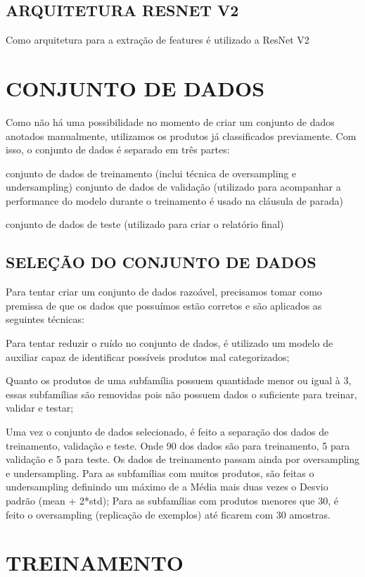 \subsection{ARQUITETURA RESNET V2}

Como arquitetura para a extração de features é utilizado a ResNet V2 

\section{CONJUNTO DE DADOS}
Como não há uma possibilidade no momento de criar um conjunto de dados anotados manualmente, utilizamos os produtos já classificados previamente.     Com isso, o conjunto de dados é separado em três partes:

conjunto de dados de treinamento (inclui técnica de oversampling e undersampling)
conjunto de dados de validação (utilizado para acompanhar a performance do modelo durante o treinamento é usado na cláusula de parada)

conjunto de dados de teste (utilizado para criar o relatório final)

\subsection{SELEÇÃO DO CONJUNTO DE DADOS}

Para tentar criar um conjunto de dados razoável, precisamos tomar como premissa de que os dados que possuímos estão corretos e são aplicados as seguintes técnicas:

Para tentar reduzir o ruído no conjunto de dados, é utilizado um modelo de auxiliar capaz de identificar possíveis produtos mal categorizados;

Quanto os produtos de uma subfamília possuem quantidade menor ou igual à 3, essas subfamílias são removidas pois não possuem dados o suficiente para treinar, validar e testar;

Uma vez o conjunto de dados selecionado, é feito a separação dos dados de treinamento, validação e teste. Onde 90 dos dados são para treinamento, 5 para validação e 5 para teste. Os dados de treinamento passam ainda por oversampling e undersampling.
Para as subfamílias com muitos produtos, são feitas o undersampling definindo um máximo de a Média mais duas vezes o Desvio padrão (mean + 2*std);
Para as subfamílias com produtos menores que 30, é feito o oversampling (replicação de exemplos) até ficarem com 30 amostras.

\section{TREINAMENTO}

